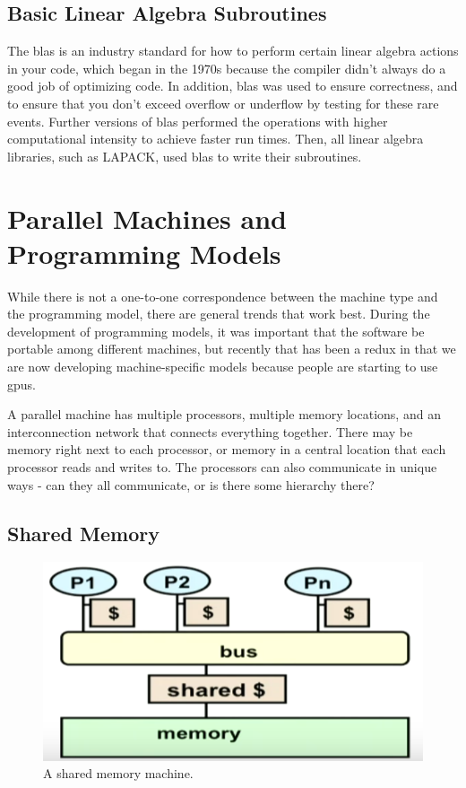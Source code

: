 \documentclass[10pt]{article}
\begin{document}
\begin{flushleft}
\subsection{Basic Linear Algebra Subroutines}

The \gls{blas} is an industry standard for how to perform certain linear algebra actions in your code, which began in the 1970s because the compiler didn't always do a good job of optimizing code. In addition, \gls{blas} was used to ensure correctness, and to ensure that you don't exceed overflow or underflow by testing for these rare events. Further versions of \gls{blas} performed the operations with higher computational intensity to achieve faster run times. Then, all linear algebra libraries, such as LAPACK, used \gls{blas} to write their subroutines.

\section{Parallel Machines and Programming Models}

While there is not a one-to-one correspondence between the machine type and the programming model, there are general trends that work best. During the development of programming models, it was important that the software be portable among different machines, but recently that has been a redux in that we are now developing machine-specific models because people are starting to use \gls{gpu}s.

A parallel machine has multiple processors, multiple memory locations, and an interconnection network that connects everything together. There may be memory right next to each processor, or memory in a central location that each processor reads and writes to. The processors can also communicate in unique ways - can they all communicate, or is there some hierarchy there? 

\subsection{Shared Memory}

\begin{figure}[H]
\centering
\includegraphics[width=0.25\linewidth]{figures/shared-memory.pdf}
\caption{A shared memory machine.}
\end{figure}


\end{flushleft}
\end{document}
